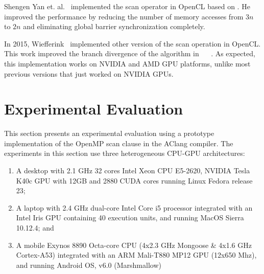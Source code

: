 \documentclass[Ingles]{ic-tese-v1}
\begin{document}
Shengen Yan et.  al.~\cite{Yan:2013}  implemented the scan operator in
OpenCL based on \cite{harris2007parallel}.  He improved the performance
by  reducing the  number  of memory  accesses from  $3n$  to $2n$  and
eliminating global barrier synchronization completely.

In 2015, Wiefferink~\cite{ScanOpenCL} implemented other version of the
scan operation in OpenCL.  This work improved the branch divergence of
the  algorithm in  ~\cite{ScanAsPrimitive} ~\cite{harris2007parallel}.
As  expected,  this  implementation  works   on  NVIDIA  and  AMD  GPU
platforms, unlike  most previous versions  that just worked  on NVIDIA
GPUs.

\chapter{Experimental Evaluation}
\label{cap:Experiments}

This  section presents  an experimental  evaluation using  a prototype
implementation of  the OpenMP scan  clause in the AClang compiler.
The  experiments in this section  use  three   heterogeneous  CPU-GPU
architectures:


\begin{enumerate}
	\item A desktop with 2.1 GHz 32 cores Intel Xeon CPU E5-2620,
	NVIDIA Tesla K40c GPU with 12GB and 2880 CUDA cores  running
	Linux Fedora  release 23;
	\item  A laptop  with  2.4  GHz dual-core  Intel  Core  i5  processor
	integrated with an Intel Iris GPU containing 40 execution units, and
	running MacOS Sierra 10.12.4; and
	\item A mobile  Exynos 8890 Octa-core  CPU (4x2.3 GHz Mongoose  \& 4x1.6
	GHz Cortex-A53)  integrated with an  ARM Mali-T880 MP12  GPU (12x650
	Mhz), and running Android OS, v6.0 (Marshmallow)
\end{enumerate}
\end{document}
